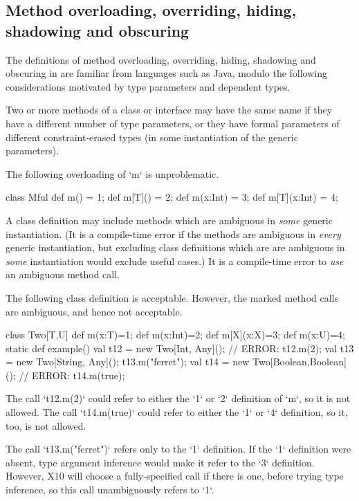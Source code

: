 \subsection{Method overloading, overriding, hiding, shadowing and obscuring}
\label{MethodOverload}



The definitions of method overloading, overriding, hiding, shadowing and
obscuring in \Xten{} are familiar from languages such as Java, modulo the
following considerations motivated by type parameters and dependent types.



Two or more methods of a class or interface may have the same
name if they have a different number of type parameters, or
they have formal parameters of different constraint-erased types (in some instantiation of the
generic parameters). 



\begin{ex}
The following overloading of \xcd`m` is unproblematic.
\begin{xten}
class Mful{
   def m() = 1;
   def m[T]() = 2;
   def m(x:Int) = 3;
   def m[T](x:Int) = 4;
}
\end{xten}
%
\end{ex}


A class definition may include methods which are ambiguous in {\em some}
generic instantiation. (It is a compile-time error if the methods are
ambiguous in {\em every} generic instantiation, but excluding class
definitions which are are ambiguous in {\em some} instantiation would exclude
useful cases.)  It is a compile-time error to {\em use} an ambiguous method
call. 

\begin{ex}
The following class definition is acceptable.  However, the marked method
calls are ambiguous, and hence not acceptable.
\begin{xten}
class Two[T,U]{
  def m(x:T)=1;
  def m(x:Int)=2;
  def m[X](x:X)=3;
  def m(x:U)=4;
  static def example() {
    val t12 = new Two[Int, Any]();
    // ERROR: t12.m(2);
    val t13  = new Two[String, Any]();
    t13.m("ferret");
    val t14 = new Two[Boolean,Boolean]();
    // ERROR: t14.m(true);
  }
}
\end{xten}
\noindent
The call \xcd`t12.m(2)` could refer to either the \xcd`1` or \xcd`2`
definition of \xcd`m`, so it is not allowed.   
The call \xcd`t14.m(true)` could refer to either the \xcd`1` or \xcd`4`
definition, so it, too, is not allowed.

The call \xcd`t13.m("ferret")` refers only to the \xcd`1` definition.  If
the \xcd`1` definition were absent, type argument inference would make it
refer to the \xcd`3` definition.  However, X10 will choose a fully-specified
call if there is one, before trying type inference, so this call unambiguously
refers to \xcd`1`.
\end{ex}


